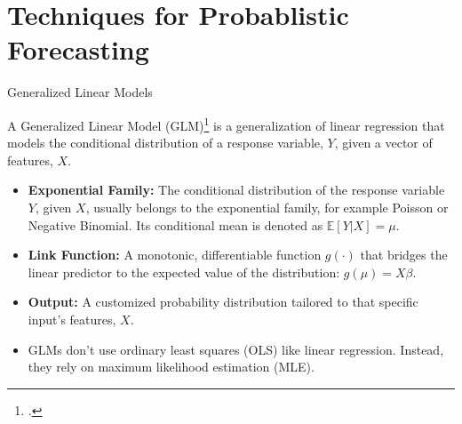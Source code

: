 \documentclass[11pt]{beamer}
\begin{document}
\section{Techniques for Probablistic Forecasting}
\begin{frame}{Generalized Linear Models}
\begin{small}

A Generalized Linear Model (GLM)\footcite[Original formulation by][]{nelder1972} is a generalization of linear regression that models the conditional distribution of a response variable, $Y$, given a vector of features, $X$. 

\begin{itemize}

\item \textbf{Exponential Family:} The conditional distribution of the response variable $Y$, given $X$, usually belongs to the exponential family, for example Poisson or Negative Binomial. Its conditional mean is denoted as $\mathbb{E}[Y|X] = \mu$.

\item \textbf{Link Function:} A monotonic, differentiable function $g(\cdot)$ that bridges the linear predictor to the expected value of the distribution: $g(\mu) = X\beta$.



\item \textbf{Output:} A customized probability distribution tailored to that specific input's features, $X$.

\item GLMs don't use ordinary least squares (OLS) like linear regression. Instead, they rely on maximum likelihood estimation (MLE).

\end{itemize}
\end{small}
\end{frame}
\end{document}
